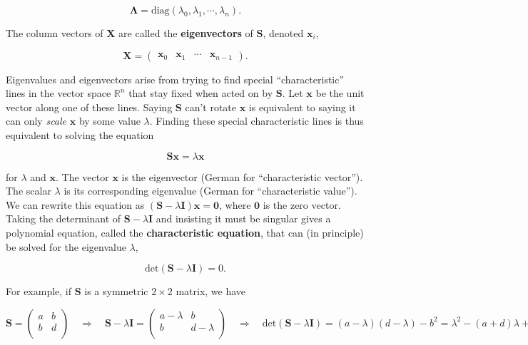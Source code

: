 \documentclass[
  letterpaper,
  DIV=11,
  numbers=noendperiod]{scrreprt}
\begin{document}
\[\mathbf{\Lambda} = \text{diag}(\lambda_0, \lambda_1, \cdots, \lambda_n).\]

The column vectors of \(\mathbf{X}\) are called the
\textbf{eigenvectors} of \(\mathbf{S}\), denoted \(\mathbf{x}_i\),

\[\mathbf{X} = \begin{pmatrix} \mathbf{x}_0 & \mathbf{x}_1 & \cdots & \mathbf{x}_{n-1} \end{pmatrix}.\]

Eigenvalues and eigenvectors arise from trying to find special
``characteristic'' lines in the vector space \(\mathbb{R}^n\) that stay
fixed when acted on by \(\mathbf{S}\). Let \(\mathbf{x}\) be the unit
vector along one of these lines. Saying \(\mathbf{S}\) can't rotate
\(\mathbf{x}\) is equivalent to saying it can only \emph{scale}
\(\mathbf{x}\) by some value \(\lambda\). Finding these special
characteristic lines is thus equivalent to solving the equation

\[\mathbf{S}\mathbf{x} = \lambda \mathbf{x}\]

for \(\lambda\) and \(\mathbf{x}\). The vector \(\mathbf{x}\) is the
eigenvector (German for ``characteristic vector''). The scalar
\(\lambda\) is its corresponding eigenvalue (German for ``characteristic
value''). We can rewrite this equation as
\((\mathbf{S} - \lambda \mathbf{I})\mathbf{x} = \mathbf{0}\), where
\(\mathbf{0}\) is the zero vector. Taking the determinant of
\(\mathbf{S} - \lambda \mathbf{I}\) and insisting it must be singular
gives a polynomial equation, called the \textbf{characteristic
equation}, that can (in principle) be solved for the eigenvalue
\(\lambda\),

\[\text{det}(\mathbf{S} - \lambda \mathbf{I}) = 0.\]

For example, if \(\mathbf{S}\) is a symmetric \(2 \times 2\) matrix, we
have

\[
\mathbf{S} = 
\begin{pmatrix}
a & b \\
b & d \\
\end{pmatrix} \quad \Longrightarrow \quad
\mathbf{S} - \lambda \mathbf{I} = 
\begin{pmatrix}
a-\lambda & b \\
b & d-\lambda \\
\end{pmatrix} \quad \Longrightarrow \quad
\text{det}(\mathbf{S} - \lambda \mathbf{I}) = (a - \lambda)(d - \lambda) - b^2 = \lambda^2 - (a + d)\lambda + (ad-b^2) = 0.
\]
\end{document}
